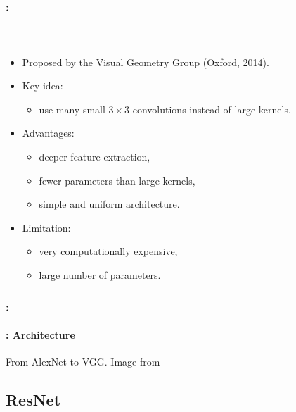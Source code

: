 \documentclass[xcolor=table]{beamer}
\begin{document}
\begin{frame}
	\frametitle{\insertshortsubtitle: \insertsection}
	\framesubtitle{\insertsubsection\ \cite{2015-simonyan-zisserman}}
	
	\begin{itemize}
		
		\item Proposed by the Visual Geometry Group (Oxford, 2014).
		
		\item Key idea:
		\begin{itemize}
			\item use many small $3 \times 3$ convolutions instead of large kernels.
		\end{itemize}
		
		\item Advantages:
		\begin{itemize}
			\item deeper feature extraction,
			\item fewer parameters than large kernels,
			\item simple and uniform architecture.
		\end{itemize}
		
		\item Limitation:
		\begin{itemize}
			\item very computationally expensive,
			\item large number of parameters.
		\end{itemize}
		
	\end{itemize}
	
\end{frame}

\begin{frame}
	\frametitle{\insertshortsubtitle: \insertsection}
	\framesubtitle{\insertsubsection: Architecture}
	
	\begin{center}
		
		From AlexNet to VGG. Image from \cite{d2l}
	\end{center}
	
\end{frame}

\subsection{ResNet}
\end{document}
